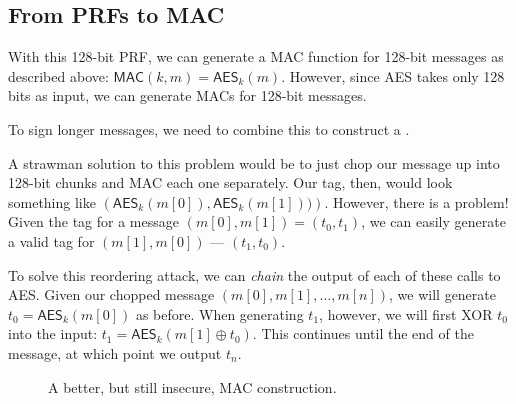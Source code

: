 \subsection{From PRFs to MAC}
With this 128-bit PRF, we can generate a MAC function for 128-bit messages as described above: $\mathsf{MAC}(k, m) = \mathsf{AES}_k(m)$. However, since AES takes only 128 bits as input, we can generate MACs for 128-bit messages. 

To sign longer messages, we need to combine this  to construct a . 

A strawman solution to this problem would be to just chop our message up into 128-bit chunks and MAC each one separately. Our tag, then, would look something like $\left(\mathsf{AES}_k(m[0]), \mathsf{AES}_k(m[1]))\right)$. However, there is a problem! Given the tag for a message $(m[0], m[1]) = (t_0, t_1)$, we can easily generate a valid tag for $(m[1], m[0])$ --- $(t_1, t_0)$. 

To solve this reordering attack, we can \emph{chain} the output of each of these calls to AES. Given our chopped message $(m[0], m[1], \ldots, m[n])$, we will generate $t_0 = \mathsf{AES}_k(m[0])$ as before. When generating $t_1$, however, we will first XOR $t_0$ into the input: $t_1 = \mathsf{AES}_k(m[1] \oplus t_0)$. This continues until the end of the message, at which point we output $t_n$.

\begin{figure}[htpb]
	\centering
	\caption{A better, but still insecure, MAC construction.}
	\label{fig:}
\end{figure}

